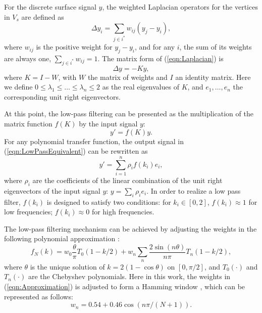 For the discrete surface signal $y$, the weighted Laplacian operators for the vertices in $V_s$ are defined as
\begin{equation}
\label{eqn:Laplacian}
\Delta y_i = \sum_{j \in i^{\ast}} w_{ij} \left( y_j - y_i \right),
\end{equation}
where $w_{ij}$ is the positive weight for $y_j - y_i$, and for any $i$, the sum of its weights are always one, $\sum_{j \in i^{\ast}} w_{ij} = 1$.
The matrix form of (\ref{eqn:Laplacian}) is
\begin{equation}
\label{eqn:LaplacianMatrix}
\Delta y = - K y,
\end{equation}
where $K = I - W$, with $W$ the matrix of weights and $I$ an identity matrix.
Here we define $0 \leq \lambda_1 \leq \ldots \leq \lambda_n \leq 2$ as the real eigenvalues of $K$, and $e_1, \ldots, e_n$ the corresponding unit right eigenvectors.

At this point, the low-pass filtering can be presented as the multiplication of the matrix function $f(K)$ by the input signal $y$:
\begin{equation}
\label{eqn:LowPassEquivalent}
y' = f(K) y.
\end{equation}
For any polynomial transfer function, the output signal in (\ref{eqn:LowPassEquivalent}) can be rewritten as
\begin{equation}
\label{eqn:LowPassPolynomial}
y' = \sum_{i=1}^{n} \rho_i f(k_i) e_i,
\end{equation}
where $\rho_i$ are the coefficients of the linear combination of the unit right eigenvectors of the input signal $y$: $y = \sum_{i} \rho_i e_i$.
In order to realize a low pass filter, $f(k_i)$ is designed to satisfy two conditions: for $k_i \in [0,2]$, $f(k_i) \approx 1$ for low frequencies; $f(k_i) \approx 0$ for high frequencies. %

The low-pass filtering mechanism can be achieved by adjusting the weights in the following polynomial approximation \cite{Taubin1996}:
\begin{equation}
\label{eqn:Approximation}
f_{N}(k) = w_0 \frac{\theta}{\pi} T_0 (1 - k / 2) + w_n \sum_{n} \frac{2 \sin (n \theta)}{n \pi} T_n(1 - k / 2),
\end{equation}
where $\theta$ is the unique solution of $k = 2 (1 - \cos \theta)$ on $[0, \pi / 2]$, and $T_0(\cdot)$ and $T_n(\cdot)$ are the Chebyshev polynomials.
Here in this work, the weights in (\ref{eqn:Approximation}) is adjusted to form a Hamming window \cite{Taubin1996}, which can be represented as follows:
\begin{equation}
\label{eqn:HammingWindow}
w_n = 0.54 + 0.46 \cos (n \pi / (N + 1) ).
\end{equation}

